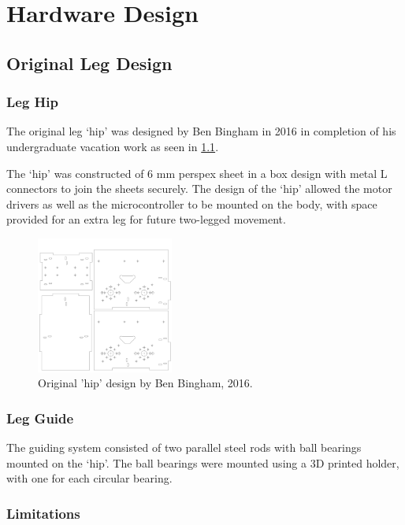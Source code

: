 \chapter{Hardware Design}

\section{Original Leg Design}
\label{sec:Original Leg Design}

\subsection{Leg Hip}
The original leg `hip' was designed by Ben Bingham in 2016 in completion of his undergraduate vacation work as seen in \cref{fig:original-hip}.

The `hip' was constructed of 6 mm perspex sheet in a box design with metal L connectors to join the sheets securely. The design of the `hip' allowed the motor drivers as well as the microcontroller to be mounted on the body, with space provided for an extra leg for future two-legged movement. 

\begin{figure}
\centering
\includegraphics[clip, trim =0cm 0cm 0cm 0cm, page =1, width=0.4\textwidth]{images/mechanical/hip-6mm-360x360}
\caption{Original 'hip' design by Ben Bingham, 2016.}
\label{fig:original-hip}
\end{figure}

\subsection{Leg Guide}
The guiding system consisted of two parallel steel rods with ball bearings mounted on the `hip'. The ball bearings were mounted using a 3D printed holder, with one for each circular  bearing. 

\subsection{Limitations}

